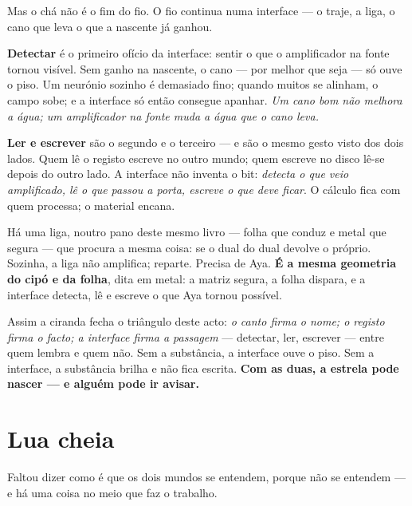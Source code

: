 \documentclass[livro.tex]{subfiles}
\begin{document}
Mas o chá não é o fim do fio. O fio continua numa interface --- o traje, a liga, o cano que
leva o que a nascente já ganhou.

\medskip

\textbf{Detectar} é o primeiro ofício da interface: sentir o que o amplificador na fonte tornou
visível. Sem ganho na nascente, o cano --- por melhor que seja --- só ouve o piso. Um neurónio
sozinho é demasiado fino; quando muitos se alinham, o campo sobe; e a interface só então
consegue apanhar. \emph{Um cano bom não melhora a água; um amplificador na fonte muda a água
que o cano leva.}

\medskip

\textbf{Ler e escrever} são o segundo e o terceiro --- e são o mesmo gesto visto dos dois
lados. Quem lê o registo escreve no outro mundo; quem escreve no disco lê-se depois do outro
lado. A interface não inventa o bit: \emph{detecta o que veio amplificado, lê o que passou a
porta, escreve o que deve ficar}. O cálculo fica com quem processa; o material encana.

\medskip

Há uma liga, noutro pano deste mesmo livro --- folha que conduz e metal que segura --- que
procura a mesma coisa: se o dual do dual devolve o próprio. Sozinha, a liga não amplifica;
reparte. Precisa de Aya. \textbf{É a mesma geometria do cipó e da folha}, dita em metal: a
matriz segura, a folha dispara, e a interface detecta, lê e escreve o que Aya tornou
possível.

\medskip

\noindent Assim a ciranda fecha o triângulo deste acto: \emph{o canto firma o nome; o registo
firma o facto; a interface firma a passagem} --- detectar, ler, escrever --- entre quem lembra
e quem não. Sem a substância, a interface ouve o piso. Sem a interface, a substância brilha e
não fica escrita. \textbf{Com as duas, a estrela pode nascer --- e alguém pode ir avisar.}

\chapter{Lua cheia}

Faltou dizer como é que os dois mundos se entendem, porque não se entendem --- e há uma coisa no
meio que faz o trabalho.

\medskip
\end{document}
